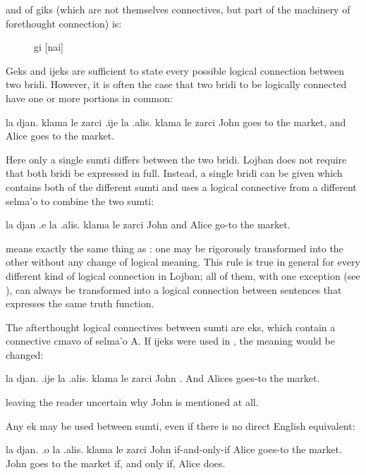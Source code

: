 and of giks (which are not themselves connectives, but part of
    the machinery of forethought connection) is: 
\begin{description}
\item[] gi [nai]
\end{description}



Geks and ijeks are sufficient to state every possible
    logical connection between two bridi. However, it is often the
    case that two bridi to be logically connected have one or more
    portions in common:
\begin{example}
la djan. klama le zarci\n
\T	.ije la .alis. klama le zarci\n
John goes to the market,\n
\T	and Alice goes to the market.
\end{example}

Here only a single sumti differs between the two bridi.
    Lojban does not require that both bridi be expressed in full.
    Instead, a single bridi can be given which contains both of the
    different sumti and uses a logical connective from a different
    selma'o to combine the two sumti:
\begin{example}
la djan .e la .alis. klama le zarci\n
John and Alice go-to the market.
\end{example}

 means exactly the same thing as
    : one may be rigorously
    transformed into the other without any change of logical
    meaning. This rule is true in general for every different kind
    of logical connection in Lojban; all of them, with one
    exception (see ), can always be
    transformed into a logical connection between sentences that
    expresses the same truth function. 

The afterthought logical connectives between sumti are eks,
    which contain a connective cmavo of selma'o A. If ijeks were
    used in , the meaning would be
    changed:
\begin{example}
la djan. .ije la .alis. klama le zarci\n
John .  And Alices goes-to the market.
\end{example}

{\noindent}leaving the reader uncertain why John is mentioned at all. 

Any ek may be used between sumti, even if there is no direct
    English equivalent:
\begin{example}
la djan. .o la .alis. klama le zarci\n
John if-and-only-if Alice goes-to the market.\n
John goes to the market if, and only if, Alice does.
\end{example}

